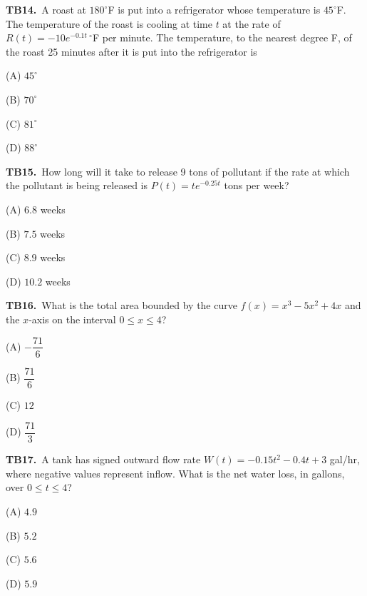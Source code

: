 \documentclass[11pt]{article}
\begin{document}
\bigskip\noindent\textbf{TB14.}\ A roast at $180^\circ$F is put into a refrigerator whose temperature is $45^\circ$F. The temperature of the roast is cooling at time $t$ at the rate of $R(t)=-10e^{-0.1t}\,{}^\circ$F per minute. The temperature, to the nearest degree F, of the roast 25 minutes after it is put into the refrigerator is
\begin{list}{}{\setlength{\leftmargin}{3em}\setlength{\labelwidth}{2.5em}\setlength{\itemsep}{0pt}\setlength{\topsep}{2pt}}
\item[(A)] $45^\circ$
\item[(B)] $70^\circ$
\item[(C)] $81^\circ$
\item[(D)] $88^\circ$
\end{list}

\bigskip\noindent\textbf{TB15.}\ How long will it take to release 9 tons of pollutant if the rate at which the pollutant is being released is $P(t)=te^{-0.25t}$ tons per week?
\begin{list}{}{\setlength{\leftmargin}{3em}\setlength{\labelwidth}{2.5em}\setlength{\itemsep}{0pt}\setlength{\topsep}{2pt}}
\item[(A)] $6.8$ weeks
\item[(B)] $7.5$ weeks
\item[(C)] $8.9$ weeks
\item[(D)] $10.2$ weeks
\end{list}

\bigskip\noindent\textbf{TB16.}\ What is the total area bounded by the curve $f(x)=x^3-5x^2+4x$ and the $x$-axis on the interval $0\leq x \leq 4$?
\begin{list}{}{\setlength{\leftmargin}{3em}\setlength{\labelwidth}{2.5em}\setlength{\itemsep}{0pt}\setlength{\topsep}{2pt}}
\item[(A)] $-\dfrac{71}{6}$
\item[(B)] $\dfrac{71}{6}$
\item[(C)] $12$
\item[(D)] $\dfrac{71}{3}$
\end{list}

\bigskip\noindent\textbf{TB17.}\ A tank has signed outward flow rate $W(t)=-0.15t^2-0.4t+3$ gal/hr, where negative values represent inflow. What is the net water loss, in gallons, over $0\le t\le4$?
\begin{list}{}{\setlength{\leftmargin}{3em}\setlength{\labelwidth}{2.5em}\setlength{\itemsep}{0pt}\setlength{\topsep}{2pt}}
\item[(A)] $4.9$
\item[(B)] $5.2$
\item[(C)] $5.6$
\item[(D)] $5.9$
\end{list}
\end{document}
